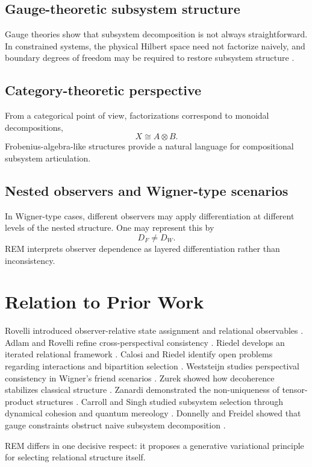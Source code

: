 \documentclass[11pt]{article}
\begin{document}
\subsection{Gauge-theoretic subsystem structure}
Gauge theories show that subsystem decomposition is not always straightforward. In constrained systems, the physical Hilbert space need not factorize naively, and boundary degrees of freedom may be required to restore subsystem structure \cite{donnelly2016}.

\subsection{Category-theoretic perspective}
From a categorical point of view, factorizations correspond to monoidal decompositions,
\[
X\cong A\otimes B.
\]
Frobenius-algebra-like structures provide a natural language for compositional subsystem articulation.

\subsection{Nested observers and Wigner-type scenarios}
In Wigner-type cases, different observers may apply differentiation at different levels of the nested structure. One may represent this by
\[
D_F\neq D_W.
\]
REM interprets observer dependence as layered differentiation rather than inconsistency.

\section{Relation to Prior Work}
Rovelli introduced observer-relative state assignment and relational observables \cite{rovelli1996}. Adlam and Rovelli refine cross-perspectival consistency \cite{adlam2023}. Riedel develops an iterated relational framework \cite{riedel2024}. Calosi and Riedel identify open problems regarding interactions and bipartition selection \cite{calosi2024}. Weststeijn studies perspectival consistency in Wigner's friend scenarios \cite{weststeijn2021}. Zurek showed how decoherence stabilizes classical structure \cite{zurek2003}. Zanardi demonstrated the non-uniqueness of tensor-product structures \cite{zanardi2001,zanardi2004}. Carroll and Singh studied subsystem selection through dynamical cohesion and quantum mereology \cite{carroll2021}. Donnelly and Freidel showed that gauge constraints obstruct naive subsystem decomposition \cite{donnelly2016}.

REM differs in one decisive respect: it proposes a generative variational principle for selecting relational structure itself.
\end{document}

